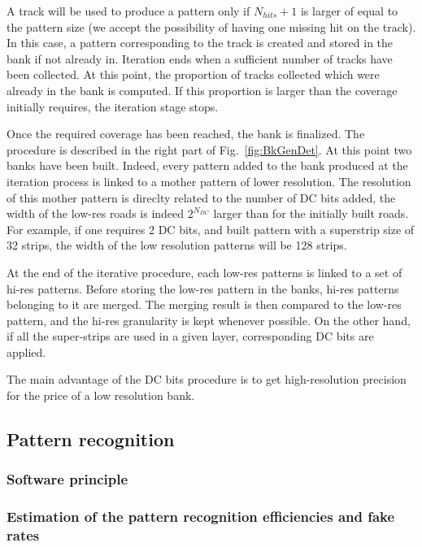 \noindent A track will be used to produce a pattern only if $N_{hits}+1$ is larger of equal to the pattern size (we accept the possibility of having one missing hit on the track). In this case, a pattern corresponding to the track is created and stored in the bank if not already in. Iteration ends when a sufficient number of tracks have been collected. At this point, the proportion of tracks collected which were already in the bank is computed. If this proportion is larger than the coverage initially requires, the iteration stage stops.

\noindent Once the required coverage has been reached, the bank is finalized. The procedure is described in the right part of Fig.~\ref{fig:BkGenDet}. At this point two banks have been built. Indeed, every pattern added to the bank produced at the iteration process is linked to a mother pattern of lower resolution. The resolution of this mother pattern is direclty related to the number of DC bits added, the width of the low-res roads is indeed $2^{N_{DC}}$ larger than for the initially built roads. For example, if one requires 2 DC bits, and built pattern with a superstrip size of 32 strips, the width of the low resolution patterns will be 128 strips. 

\noindent At the end of the iterative procedure, each low-res patterns is linked to a set of hi-res patterns. Before storing the low-res pattern in the banks, hi-res patterns belonging to it are merged. The merging result is then compared to the low-res pattern, and the hi-res granularity is kept whenever possible. On the other hand, if all the super-strips are used in a given layer, corresponding DC bits are applied.

\noindent The main advantage of the DC bits procedure is to get high-resolution precision for the price of a low resolution bank. 


\subsection{Pattern recognition}

\subsubsection{Software principle}

\subsubsection{Estimation of the pattern recognition efficiencies and fake rates}


